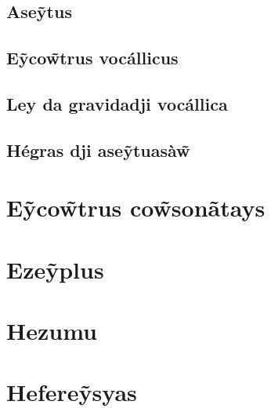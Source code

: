 \documentclass[12pt, a4paper]{article}
\begin{document}
\begin{bilingualpages}
    \subsection{Ase\~ytus}
    \subsection{E\~yco\~wtrus vocállicus}
    \subsection{Ley da gravidadji vocállica}
    \subsection{Hégras dji ase\~ytuasà\~w}

    \section{E\~yco\~wtrus co\~wsonãtays}

    \section{Eze\~yplus}
    
\end{bilingualpages}

\newpage
\section{Hezumu}

\newpage
\section{Hefere\~ysyas}
\end{document}
